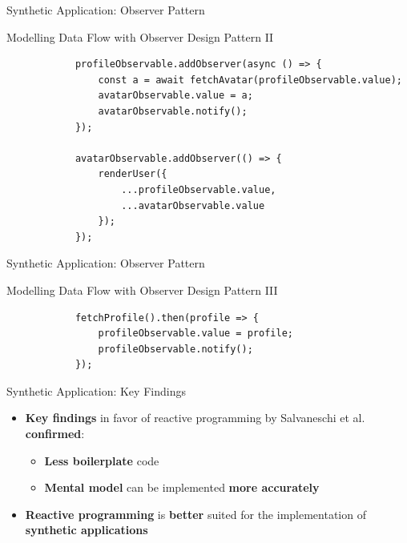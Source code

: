 \documentclass{beamer}
\begin{document}
\begin{frame}[fragile=singleslide]{Synthetic Application: Observer Pattern}
	\begin{block}{Modelling Data Flow with Observer Design Pattern \cite{gamma1995design} II}
		\begin{verbatim}
			profileObservable.addObserver(async () => {
				const a = await fetchAvatar(profileObservable.value);
				avatarObservable.value = a;
				avatarObservable.notify();
			});

			avatarObservable.addObserver(() => {
				renderUser({
					...profileObservable.value,
					...avatarObservable.value
				});
			});
		\end{verbatim}
	\end{block}
\end{frame}

\begin{frame}[fragile=singleslide]{Synthetic Application: Observer Pattern}
	\begin{block}{Modelling Data Flow with Observer Design Pattern \cite{gamma1995design} III}
		\begin{verbatim}
			fetchProfile().then(profile => {
				profileObservable.value = profile;
				profileObservable.notify();
			});
		\end{verbatim}
	\end{block}
\end{frame}

\begin{frame}{Synthetic Application: Key Findings}
	\begin{itemize}
		\item \textbf{Key findings} in favor of reactive programming by Salvaneschi et al. \cite{7827078} \textbf{confirmed}:\smallskip
		\begin{itemize}
			\item \textbf{Less boilerplate} code\smallskip
			\item \textbf{Mental model} can be implemented \textbf{more accurately}
		\end{itemize}\bigskip
		\item \textbf{Reactive programming} is \textbf{better} suited for the implementation of \textbf{synthetic applications}
	\end{itemize}
\end{frame}
\end{document}

